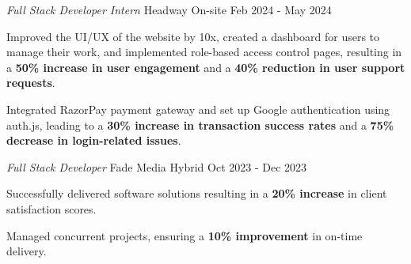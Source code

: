 
\begin{cventries}
  
  \cventry
  {\textnormal{\textit{Full Stack Developer Intern}}} %
  {Headway} %
  {On-site} %
  {Feb 2024 - May 2024} %
  {
    \begin{cvitems} %
\item {Improved the UI/UX of the website by 10x, created a dashboard for users to manage their work, and implemented role-based access control pages, resulting in a {\bf50\% increase in user engagement} and a {\bf 40\% reduction in user support requests}.}
\item {Integrated RazorPay payment gateway and set up Google authentication using auth.js, leading to a {\bf30\% increase in transaction success rates} and a {\bf75\% decrease in login-related issues}.}
    \end{cvitems}
  }
  
  \cventry
  {\textnormal{\textit{Full Stack Developer}}}
  {Fade Media}
  {Hybrid}
  {Oct 2023 - Dec 2023}
  {
    \begin{cvitems}
      \item {Successfully delivered software solutions resulting in a {\bf 20\% increase} in client satisfaction scores.}
      \item {Managed concurrent projects, ensuring a {\bf 10\% improvement} in on-time delivery.}
    \end{cvitems}
  }
  
\end{cventries}
